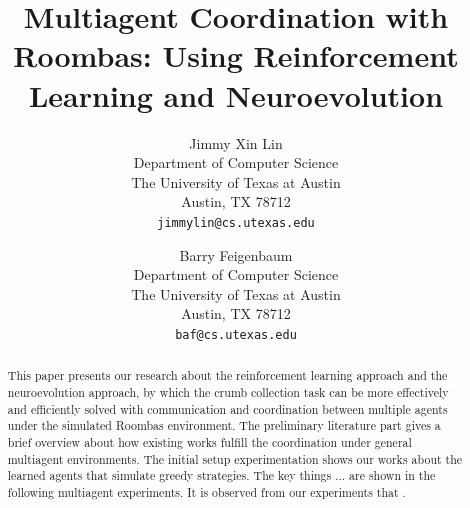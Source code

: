 \documentclass[conference]{IEEEtran}
\begin{document}
%
\title{Multiagent Coordination with Roombas: Using
    Reinforcement Learning and Neuroevolution}



\author{ 
Jimmy Xin Lin \\
Department of Computer Science\\
The University of Texas at Austin\\
Austin, TX 78712 \\
\texttt{jimmylin@cs.utexas.edu} \\
\and
Barry Feigenbaum \\
Department of Computer Science\\
The University of Texas at Austin\\
Austin, TX 78712 \\
\texttt{baf@cs.utexas.edu} \\
}

\maketitle

\begin{abstract}
    This paper presents our research about the reinforcement learning approach
    and the neuroevolution approach, by which the crumb collection task can be
    more effectively and efficiently solved with communication and
    coordination between multiple agents under the simulated Roombas
    environment.
    The preliminary literature part gives a brief overview about how existing
    works fulfill the coordination under general multiagent environments.
    The initial setup experimentation shows our works about the
    learned agents that simulate greedy strategies.
    The key things ... are shown in the following multiagent experiments.
    It is observed from our experiments that .
\end{abstract}

\IEEEpeerreviewmaketitle
\end{document}
